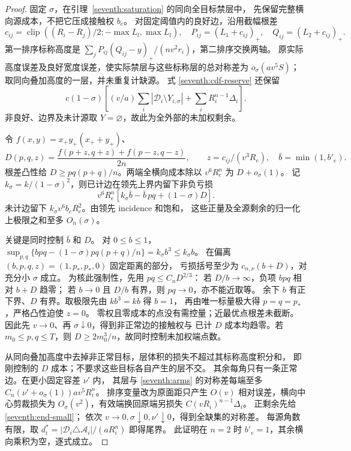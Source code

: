 \begin{proof}
固定 \(\sigma\)，在引理~\ref{seventh:saturation} 的同向全目标禁层中，
先保留完整横向源成本，不把它压成接触权 \(b_e\)。
对固定阈值内的良好边，沿用截幅根差
\[
 c_{ij}=\operatorname{clip}((R_i-R_j)/2;-\max L_l,\max L_l),\quad
 P_{ij}=(L_1+c_{ij})_+,\quad Q_{ij}=(L_2+c_{ij})_+.
\]
第一排序标称高度是
\(\sum_jP_{ij}(Q_{ij}-y)_+/(nv^2r_i)\)，第二排序交换两轴。
原实际高度误差及良好宽度误差，使实际禁层与这些标称层的总对称差为
\(o_\sigma(av^5S)\)；取同向叠加高度的一层，并未重复计缺源。
式 \eqref{seventh:cdf-reserve} 还保留
\[
 c(1-\sigma)\left[
 (v/a)\sum_i|\mathscr D_i\setminus Y_{i,\sigma}|
 +\sum_iR_i^{n-1}\Delta_i\right].
\]
非良好、边界及未计源取 \(Y=\varnothing\)，故此为全外部的未加权剩余。

令 \(f(x,y)=x_+y_+(x_++y_+)\)、
\[
 D(p,q,z)=\frac{f(p+z,q+z)+f(p-z,q-z)}{2n},\qquad
 z=c_{ij}/(v^3R_e),\quad \bar b=\min(1,b'_e).
\]
根差凸性给 \(D\ge pq(p+q)/n\)。两端全横向成本除以
\(v^6R_e^n\) 为 \(D+o_\sigma(1)\)。
记 \(k_\sigma=k/(1-\sigma)^2\)，则已计边在领先上界内留下非负亏损
\begin{equation}\label{seventh:stable-loss}
 v^6R_e^n[k_\sigma\bar b-\bar b\,pq+(1-\sigma)D].
\end{equation}
未计边留下 \(k_\sigma v^6b_eR_e^2\)。由领先 incidence 和饱和，
这些正量及全源剩余的归一化上极限之和至多 \(O_n(\sigma)\)。

关键是同时控制 \(\bar b\) 和 \(D\)。
对 \(0\le b\le1\)，
\(\sup_{p,q}\{bpq-(1-\sigma)pq(p+q)/n\}=k_\sigma b^3\le k_\sigma b\)。
在偏离 \((b,p,q,z)=(1,p_*,p_*,0)\) 固定距离的部分，
亏损括号至少为 \(c_{n,\nu}(b+D)\)，对充分小 \(\sigma\) 成立。
为核此强制性，先用 \(pq\le C_nD^{2/3}\)：
若 \(D/b\to\infty\)，负项 \(bpq\) 相对 \(b+D\) 趋零；
若 \(b\to0\) 且 \(D/b\) 有界，则 \(pq\to0\)，亦不能近取等。
余下 \(b\) 有正下界、\(D\) 有界。取极限先由 \(kb^3=kb\) 得 \(b=1\)，
再由唯一标量极大得 \(p=q=p_*\)，严格凸性迫使 \(z=0\)。
零权且零成本的点没有需控量；近最优点根差未截断。
因此先 \(v\to0\)、再 \(\sigma\downarrow0\)，得到非正常边的接触权与
已计 \(D\) 成本均趋零。若 \(m_0\le p,q\le T\)，则
\(D\ge2m_0^3/n\)，故同时控制未加权端点数。

从同向叠加高度中去掉非正常目标，层体积的损失不超过其标称高度积分和，
即刚控制的 \(D\) 成本；不要求这些目标各自产生的层不交。
其余每角只有一条正常边。在更小固定容差 \(\nu'\) 内，
其层与 \eqref{seventh:arms} 的对称差每端至多
\(C_n(\nu'+o_\sigma(1))av^5R_i^n\)。
排序变量改为原面距只产生 \(O(v)\) 相对误差，横向中心剪裁损失为
\(O_\sigma(v^2)\)，有效端换回原端另损失
\(C(vR_i)^{n-1}\Delta_i\)。
正剩余先给 \eqref{seventh:end-small}；
依次 \(v\to0,\sigma\downarrow0,\nu'\downarrow0\)，得到全缺集的对称差。
每源角数有限，取
\(d_i^*=|\mathscr D_i\triangle\mathcal A_i|/(aR_i^n)\) 即得尾界。
此证明在 \(n=2\) 时 \(b'_e=1\)，其余横向乘积为空，逐式成立。
\end{proof}

